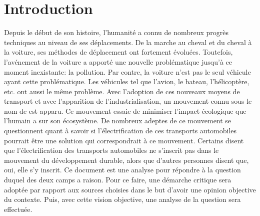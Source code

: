 
\chapter{Introduction}

Depuis le début de son histoire, l'humanité a connu de nombreux progrès techniques au niveau de ses déplacements. De la marche au cheval et du cheval à la voiture, ses méthodes de déplacement ont fortement évoluées. Toutefois, l'avénement de la voiture a apporté une nouvelle problématique jusqu'à ce moment inexistante: la pollution. Par contre, la voiture n'est pas le seul véhicule ayant cette problématique. Les véhicules tel que l'avion, le bateau, l'hélicoptère, etc. ont aussi le même problème. Avec l'adoption de ces nouveaux moyens de transport et avec l'apparition de l'industrialisation, un mouvement connu sous le nom de  est apparu. Ce mouvement essaie de minimiser l'impact écologique que l'humain a sur son écosystème. De nombreux adeptes de ce mouvement se questionnent quant à savoir si l'électrification de ces transports automobiles pourrait être une solution qui correspondrait à ce mouvement. Certains disent que l'électrification des transports automobiles ne s'inscrit pas dans le mouvement du développement durable, alors que d'autres personnes disent que, oui, elle s'y inscrit. Ce document est une analyse pour répondre à la question duquel des deux camps a raison. Pour ce faire, une démarche critique sera adoptée par rapport aux sources choisies dans le but d'avoir une opinion objective du contexte. Puis, avec cette vision objective, une analyse de la question sera effectuée.
